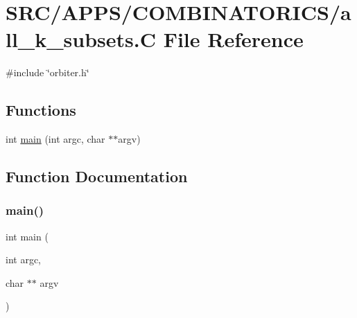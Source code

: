 \hypertarget{all__k__subsets_8_c}{}\section{S\+R\+C/\+A\+P\+P\+S/\+C\+O\+M\+B\+I\+N\+A\+T\+O\+R\+I\+C\+S/all\+\_\+k\+\_\+subsets.C File Reference}
\label{all__k__subsets_8_c}
{\ttfamily \#include \char`\"{}orbiter.\+h\char`\"{}}\newline
\subsection*{Functions}
\begin{DoxyCompactItemize}
\item 
int \mbox{\hyperlink{all__k__subsets_8_c_a3c04138a5bfe5d72780bb7e82a18e627}{main}} (int argc, char $\ast$$\ast$argv)
\end{DoxyCompactItemize}


\subsection{Function Documentation}
\mbox{\label{all__k__subsets_8_c_a3c04138a5bfe5d72780bb7e82a18e627}} 
\subsubsection{\texorpdfstring{main()}{main()}}
{\footnotesize\ttfamily int main (\begin{DoxyParamCaption}\item[{int}]{argc,  }\item[{char $\ast$$\ast$}]{argv }\end{DoxyParamCaption})}

